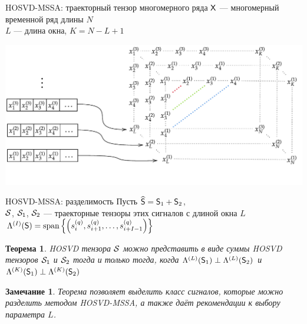 \documentclass[pdf, unicode, 9pt, notheorems, handout]{beamer}
\newtheorem{theorem}{Теорема}
\newtheorem{remark}{Замечание}
\begin{document}
    \begin{frame}{HOSVD-MSSA: траекторный тензор многомерного ряда}
        $\mathsf{X}$ --- многомерный временной ряд длины $N$\\
        $L$ --- длина окна, $K=N-L+1$ 
        
        \vspace{0.4cm}
        
        \centering
        \includegraphics[width=\textwidth]{./img/mssa_injection_new}
    \end{frame}
    
    \begin{frame}{HOSVD-MSSA: разделимость}
        Пусть $\widehat{\mathsf{S}} = \mathsf{S}_1 + \mathsf{S}_2$, \\ 
        $\mathcal{S}$, $\mathcal{S}_1$, $\mathcal{S}_2$ --- траекторные тензоры этих сигналов с длиной
        окна $L$\\ \vspace{0.2cm}
        $\Lambda^{(I)}(\mathsf{S}) = \operatorname{span}\left\{\left(s_i^{(q)}, s_{i+1}^{(q)}, \ldots, s_{i + I - 1}^{(q)}\right)\right\}$
        \begin{theorem}
            \textup{HOSVD} тензора $\mathcal{S}$ можно представить в виде суммы \textup{HOSVD} тензоров $\mathcal{S}_1$ и
            $\mathcal{S}_2$ тогда и только тогда, когда
            $\Lambda^{(L)}(\mathsf{S}_1) \perp \Lambda^{(L)}(\mathsf{S}_2)$ и 
            $\Lambda^{(K)}(\mathsf{S}_1)\perp\Lambda^{(K)}(\mathsf{S}_2)$
        \end{theorem}
        \vspace{0.2cm}
        \begin{remark}
            Теорема позволяет выделить класс сигналов, которые можно разделить методом \textup{HOSVD-MSSA},
            а также даёт рекомендации к выбору параметра $L$.
        \end{remark}
    \end{frame}
    
\end{document}
